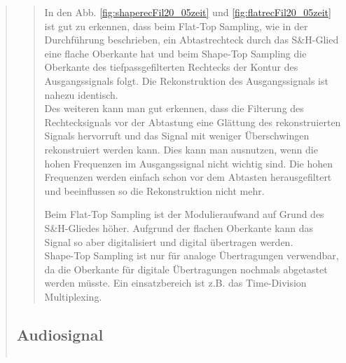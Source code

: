 \begin{quote}
\begin{quote}
            In den Abb. \ref{fig:shaperecFil20_05zeit} und \ref{fig:flatrecFil20_05zeit} ist gut zu erkennen, dass beim
            Flat-Top Sampling, wie in der Durchführung beschrieben, ein Abtastrechteck durch das S\&H-Glied eine flache
            Oberkante hat und beim Shape-Top Sampling die Oberkante des tiefpassgefilterten Rechtecks der Kontur des
            Ausgangssignals folgt.
            Die Rekonstruktion des Ausgangssignals ist nahezu identisch.\\
            Des weiteren kann man gut erkennen, dass die Filterung des Rechtecksignals vor der Abtastung eine Glättung des
            rekonstruierten Signals hervorruft und das Signal mit weniger Überschwingen rekonstruiert werden kann. Dies kann
            man ausnutzen, wenn die hohen Frequenzen im Ausgangssignal nicht wichtig sind. Die hohen Frequenzen werden
            einfach schon vor dem Abtasten herausgefiltert und beeinflussen so die Rekonstruktion nicht mehr.
            
            Beim Flat-Top Sampling ist der Modulieraufwand auf Grund des S\&H-Gliedes höher. Aufgrund der flachen
            Oberkante kann das Signal so aber digitalisiert und digital übertragen werden.\\
            Shape-Top Sampling ist nur für analoge Übertragungen verwendbar, da die Oberkante für digitale
            Übertragungen nochmals abgetastet werden müsste. Ein einsatzbereich ist z.B. das Time-Division Multiplexing.
            
      
      \end{quote}
      
      \subsection{Audiosignal}
      \begin{quote}
      
          \begin{center}
                \begin{tabular}{ll}
                

\end{tabular}
\end{center}
\end{quote}
\end{quote}

